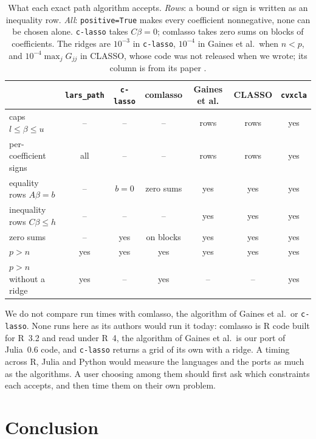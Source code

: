\documentclass[11pt]{article}
\theoremstyle{remark}
\begin{document}
\begin{table}[!htbp]
\centering
\small\setlength{\tabcolsep}{4pt}
\begin{tabular}{lcccccc}
\toprule
 & \texttt{lars\_path} & \texttt{c-lasso} & comlasso & Gaines et al. & CLASSO & \texttt{cvxcla} \\
\midrule
caps $l\le\beta\le u$            & --  & --  & --  & rows & rows & yes \\
per-coefficient signs           & all & --  & --  & rows & rows & yes \\
equality rows $A\beta=b$        & --  & $b=0$ & zero sums & yes & yes & yes \\
inequality rows $C\beta\le h$   & --  & --  & --  & yes & yes & yes \\
zero sums                       & --  & yes & on blocks & yes & yes & yes \\
$p>n$                           & yes & yes & yes & yes & yes & yes \\
$p>n$ without a ridge           & yes & --  & yes & --  & --  & yes \\
\bottomrule
\end{tabular}
\caption{What each exact path algorithm accepts. \emph{Rows}: a bound or sign is
written as an inequality row. \emph{All}: \texttt{positive=True} makes every coefficient
nonnegative, none can be chosen alone. \texttt{c-lasso} takes $C\beta=0$; comlasso takes
zero sums on blocks of coefficients. The ridges are $10^{-3}$ in \texttt{c-lasso},
$10^{-4}$ in Gaines et al.\ when $n<p$, and $10^{-4}\max_jG_{jj}$ in CLASSO, whose code
was not released when we wrote; its column is from its paper \cite{hobson2026}.}
\label{tab:software}
\end{table}

We do not compare run times with comlasso, the algorithm of Gaines et al.\ or
\texttt{c-lasso}. None runs here as its authors would run it today: comlasso is R code
built for R~3.2 and read under R~4, the algorithm of Gaines et al.\ is our port of
Julia~0.6 code, and \texttt{c-lasso} returns a grid of its own with a ridge. A timing
across R, Julia and Python would measure the languages and the ports as much as the
algorithms. A user choosing among them should first ask which constraints each
accepts, and then time them on their own problem.

\section{Conclusion}
\label{sec:conclusion}
\end{document}
